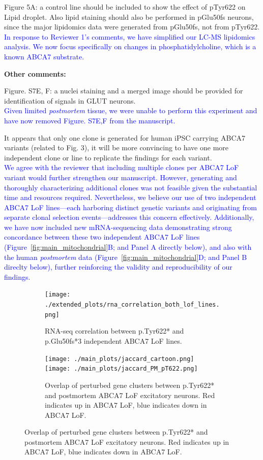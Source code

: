 \documentclass[12pt]{article}
\begin{document}
Figure 5A: a control line should be included to show the effect of pTyr622 on Lipid droplet. Also lipid staining should also be performed in pGlu50fs neurons, since the major lipidomics data were generated from pGlu50fs, not from pTyr622.\\
\textcolor{blue}{In response to Reviewer 1’s comments, we have simplified our LC-MS lipidomics analysis. We now focus specifically on changes in phosphatidylcholine, which is a known ABCA7 substrate.}



\textbf{Other comments:}

Figure. S7E, F: a nuclei staining and a merged image should be provided for identification of signals in GLUT neurons.\\
\textcolor{blue}{Given limited \textit{postmortem} tissue, we were unable to perform this experiment and have now removed Figure. S7E,F from the manuscript.}

It appears that only one clone is generated for human iPSC carrying ABCA7 variants (related to Fig. 3), it will be more convincing to have one more independent clone or line to replicate the findings for each variant.\\
\textcolor{blue}{We agree with the reviewer that including multiple clones per ABCA7 LoF variant would further strengthen our manuscript. However, generating and thoroughly characterizing additional clones was not feasible given the substantial time and resources required. Nevertheless, we believe our use of two independent ABCA7 LoF lines—each harboring distinct genetic variants and originating from separate clonal selection events—addresses this concern effectively. Additionally, we have now included new mRNA-sequencing data demonstrating strong concordance between these two independent ABCA7 LoF lines (Figure~\ref{fig:main_mitochondrial}B; and Panel A directly below), and also with the human \textit{postmortem} data (Figure~\ref{fig:main_mitochondrial}D; and Panel B direclty below), further reinforcing the validity and reproducibility of our findings.}

\begin{figure}[H] 
	\centering
	\begin{subfigure}[t]{.4\textwidth}
		\caption{RNA-seq correlation between p.Tyr622* and p.Glu50fs*3 independent ABCA7 LoF lines.}
        \vspace{2cm}
		\texttt{[image: ./extended\_plots/rna\_correlation\_both\_lof\_lines.png]}        
	\end{subfigure} 
    \hspace{1cm}
    \begin{subfigure}[t]{0.4\textwidth}
		\caption{Overlap of perturbed gene clusters between p.Tyr622* and postmortem ABCA7 LoF excitatory neurons. Red indicates up in ABCA7 LoF, blue indicates down in ABCA7 LoF.}
        \vspace{1cm}
        \centering
        \texttt{[image: ./main\_plots/jaccard\_cartoon.png]}        
        \texttt{[image: ./main\_plots/jaccard\_PM\_pT622.png]}        
    \end{subfigure}  
\end{figure}
\end{document}
